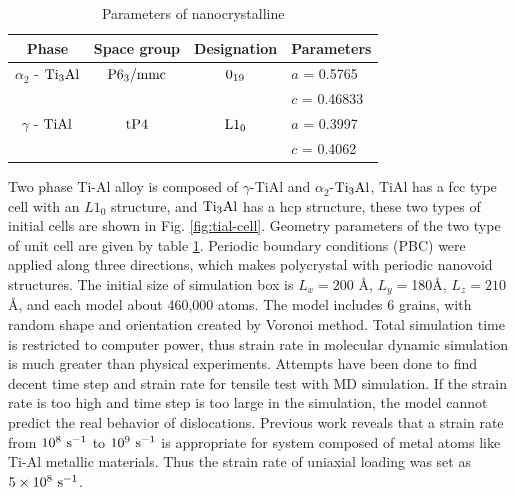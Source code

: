 \documentclass[materials,article,submit,moreauthors,pdftex,10pt,a4paper]{Definitions/mdpi}
\begin{document}
\begin{table}[ht]
	\caption{Parameters of nanocrystalline}
	\centering
	\begin{tabular}{c c c l}
	\toprule
	\textbf{Phase}			& {Space group}		& {Designation} 		& {Parameters} \\
	\midrule
	$\alpha_2$ - $\rm{Ti_3Al}$		& $\rm P6_3/mmc$ 	& $\rm 0_{19}$ 		& $a$ = 0.5765 \\
		&					&					& $c$ = 0.46833 \\
	$\gamma$ - $\rm{TiAl}$ 		& $\rm tP4$ 		& $\rm L1_0$		& $a$ = 0.3997 \\
		&					&					& $c$ = 0.4062 \\			
	\bottomrule
	\end{tabular} 
	\label{tab:lattice_parameter}
\end{table} 

Two phase Ti-Al alloy is composed of $\gamma $-TiAl and $\alpha_2$-$\rm Ti_3Al$, TiAl has a fcc type cell with an $L1_0$ structure, and $\rm Ti_3Al$ has a hcp structure, these two types of initial cells are shown in Fig. \ref{fig:tial-cell}. Geometry parameters of the two type of unit cell are given by table \ref{tab:lattice_parameter}. Periodic boundary conditions (PBC) were applied along three directions, which makes polycrystal with periodic nanovoid structures. The initial size of simulation box is $L_x =200$ \si{\angstrom}, $L_y = $180\si{\angstrom}, $L_z = 210$ \si{\angstrom}, and each model  about 460,000 atoms. The model includes 6 grains, with random shape and orientation created by Voronoi method. Total simulation time is restricted to computer power, thus strain rate in molecular dynamic simulation is much greater than physical experiments. Attempts have been done to find decent time step and strain rate for tensile test with MD simulation. If the strain rate is too high and time step is too large in the simulation, the model cannot predict the real behavior of dislocations.  Previous work \cite{Zhu2008,Wu2016}  reveals that a strain rate from  $10^8\ \rm{s}^{-1}$ to $10^9\ \rm{s}^{-1}$ is appropriate for system composed of metal atoms like Ti-Al metallic materials. Thus the strain rate of uniaxial loading was set as $5\times10^8\ \rm{s}^{-1}$.  

\end{document}
